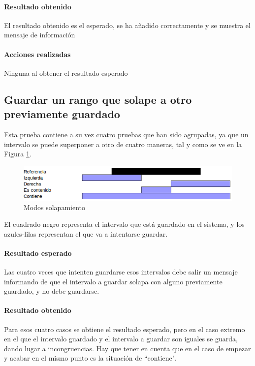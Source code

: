 \paragraph{Resultado obtenido}
El resultado obtenido es el esperado, se ha a\~nadido correctamente y se muestra
el mensaje de informaci\'on

\paragraph{Acciones realizadas}
Ninguna al obtener el resultado esperado

\subsection{Guardar un rango que solape a otro previamente guardado}
Esta prueba contiene a su vez cuatro pruebas que han sido agrupadas, ya que un intervalo
se puede superponer a otro de cuatro maneras, tal y como se ve en la Figura \ref{fig:ModosSolapamiento}.

\begin{figure}[H]
\centering
\includegraphics[width=0.9\linewidth]{./Figures/ModosSolapamiento.png}
\caption{Modos solapamiento}
\label{fig:ModosSolapamiento}
\end{figure}

El cuadrado negro representa el intervalo que est\'a guardado en el sistema, y 
los azules-lilas representan el que va a intentarse guardar.

\paragraph{Resultado esperado}
Las cuatro veces que intenten guardarse esos intervalos debe salir un mensaje informando
de que el intervalo a guardar solapa con alguno previamente guardado, y no debe
guardarse.

\paragraph{Resultado obtenido}
Para esos cuatro casos se obtiene el resultado esperado, pero en el caso extremo
en el que el intervalo guardado y el intervalo a guardar son iguales se guarda, dando
lugar a incongruencias. Hay que tener en cuenta que en el caso de empezar y acabar
en el mismo punto es la situaci\'on de ``contiene".

